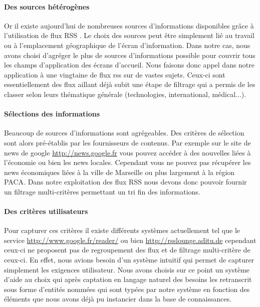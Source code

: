 \documentclass[]{easychair}
\begin{document}
\paragraph*{Des sources hétérogènes}
Or il existe aujourd'hui de nombreuses sources d'informations disponibles grâce à l'utilisation de flux RSS \cite{RSS version 2.0 Specifications, http://blogs.law.harvard.edu/tech/rss, 2003.}. Le choix des sources peut être simplement lié au travail ou à l'emplacement géographique de l'écran d'information.
Dans notre cas, nous avons choisi d'agréger le plus de sources d'informations possible pour couvrir tous les champs d'application des écrans d'accueil. 
Nous faisons donc appel dans notre application à une vingtaine de flux rss sur de vastes sujets. Ceux-ci sont essentiellement des flux aillant déjà subit une étape de filtrage qui a permis de les classer selon leurs thématique générale (technologies, international, médical...).

\paragraph*{Sélections des informations}
Beaucoup de sources d'informations sont agrégeables. Des critères de sélection sont alors pré-établis par les fournisseurs de contenus.  Par exemple sur le site de news de google \url{http://news.google.fr} vous pouvez accéder à des nouvelles liées à l'économie ou bien les news locales. Cependant  vous ne pouvez pas récupérer les news économiques liées à la ville de Marseille ou plus largement à la région PACA. Dans notre exploitation des flux RSS nous devons donc pouvoir fournir un filtrage multi-critères permettant un tri fin des informations. 


\paragraph*{Des critères utilisateurs}

Pour capturer ces critères il existe différents systèmes actuellement tel que le service \url{http://www.google.fr/reader/} ou bien \url{http://rsslounge.aditu.de} cependant ceux-ci ne proposent pas de regroupement des flux et de filtrage multi-critère de ceux-ci.
En effet, nous avions besoin d'un système intuitif qui permet de capturer simplement les exigences utilisateur. Nous avons choisis sur ce point un système d'aide au choix qui après captation en langage naturel des besoins les retranscrit sous forme d'entités nommées qui sont typées par notre système en fonction des éléments que nous avons déjà pu instancier dans la base de connaissances.
\end{document}
